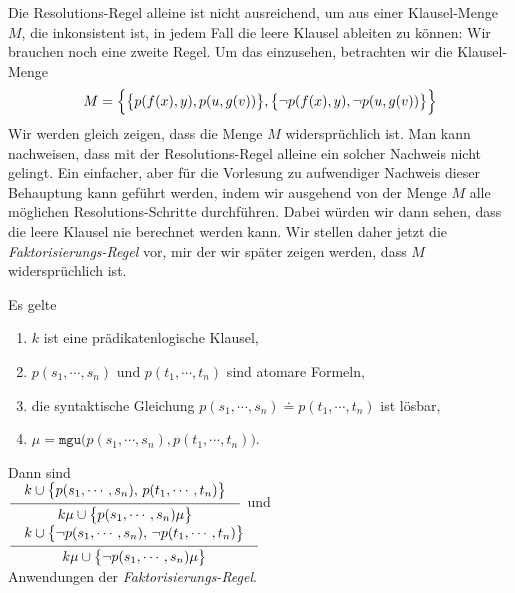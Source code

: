 \noindent
Die Resolutions-Regel alleine ist nicht ausreichend, um aus einer Klausel-Menge $M$, die
inkonsistent ist, in 
jedem Fall die leere Klausel ableiten zu k\"{o}nnen: Wir brauchen noch eine zweite Regel.
Um das einzusehen, betrachten wir die Klausel-Menge 
\[ M = \Bigl\{ \bigl\{p(f(x),y), p(u,g(v))\bigr\}, 
               \bigl\{\neg p(f(x),y), \neg p(u,g(v))\bigr\} \Bigr\} 
\]
Wir werden gleich zeigen, dass die Menge $M$ widerspr\"{u}chlich ist.  Man kann nachweisen,
dass mit der Resolutions-Regel alleine ein solcher Nachweis nicht gelingt.
Ein einfacher, aber f\"{u}r die Vorlesung zu aufwendiger Nachweis dieser Behauptung kann
gef\"{u}hrt werden, indem wir ausgehend von der Menge $M$ alle m\"{o}glichen Resolutions-Schritte
durchf\"{u}hren.  Dabei w\"{u}rden wir dann sehen, dass die leere Klausel nie berechnet werden kann.
Wir stellen daher jetzt die
{\emph{\color{blue}Faktorisierungs-Regel}} vor, mir der wir sp\"{a}ter zeigen werden, dass $M$ widerspr\"{u}chlich
ist.
\pagebreak

\begin{Definition} Es gelte 
  \begin{enumerate}
  \item $k$ ist  eine pr\"{a}dikatenlogische Klausel,
  \item $p(s_1,\cdots,s_n)$ und $p(t_1,\cdots,t_n)$ sind atomare Formeln,
  \item die syntaktische Gleichung $p(s_1,\cdots,s_n)  \doteq p(t_1,\cdots,t_n)$ ist l\"{o}sbar, 
  \item $\mu = \mathtt{mgu}\bigl(p(s_1,\cdots,s_n), p(t_1,\cdots,t_n)\bigr)$.
  \end{enumerate}
  Dann sind \\[0.3cm]
  \hspace*{0.8cm}
  $\schluss{k \cup \bigl\{p(s_1,\cdots,s_n),\, p(t_1,\cdots,t_n)\bigl\}}{k\mu \cup \bigl\{p(s_1,\cdots,s_n)\mu\bigr\} }$ 
  \quad und \quad
  $\schluss{k \cup \bigl\{ \neg p(s_1,\cdots,s_n),\, \neg p(t_1,\cdots,t_n)\bigl\}}{k\mu \cup \bigl\{\neg p(s_1,\cdots,s_n)\mu\bigr\} }$ 
  \\[0.3cm]
  Anwendungen der \emph{\color{blue}Faktorisierungs-Regel}.
  \eox
\end{Definition}

